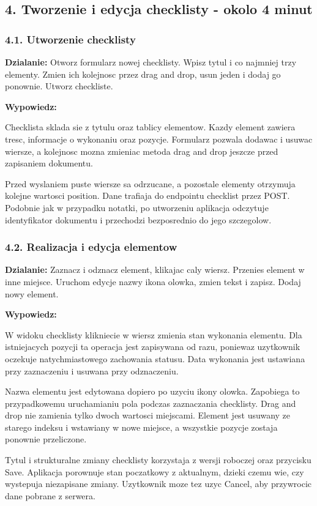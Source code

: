 \documentclass[
  polish,
  12pt,
  a4paper,
]{article}
\renewenvironment{quote}
  {\list{}{\leftmargin=1.2em\rightmargin=0.6em}%
   \item\relax\color{black}\setlength{\parskip}{0.7em}}
  {\endlist}
\begin{document}
\subsection{4. Tworzenie i edycja checklisty - okolo 4
minut}\label{4-tworzenie-i-edycja-checklisty---okolo-4-minut}

\subsubsection{4.1. Utworzenie
checklisty}\label{41-utworzenie-checklisty}

\textbf{Dzialanie:} Otworz formularz nowej checklisty. Wpisz tytul i co
najmniej trzy elementy. Zmien ich kolejnosc przez drag and drop, usun
jeden i dodaj go ponownie. Utworz checkliste.

\textbf{Wypowiedz:}

\begin{quote}
Checklista sklada sie z tytulu oraz tablicy elementow. Kazdy element
zawiera tresc, informacje o wykonaniu oraz pozycje. Formularz pozwala
dodawac i usuwac wiersze, a kolejnosc mozna zmieniac metoda drag and
drop jeszcze przed zapisaniem dokumentu.

Przed wyslaniem puste wiersze sa odrzucane, a pozostale elementy
otrzymuja kolejne wartosci position. Dane trafiaja do endpointu
checklist przez POST. Podobnie jak w przypadku notatki, po utworzeniu
aplikacja odczytuje identyfikator dokumentu i przechodzi bezposrednio do
jego szczegolow.
\end{quote}

\subsubsection{4.2. Realizacja i edycja
elementow}\label{42-realizacja-i-edycja-elementow}

\textbf{Dzialanie:} Zaznacz i odznacz element, klikajac caly wiersz.
Przenies element w inne miejsce. Uruchom edycje nazwy ikona olowka,
zmien tekst i zapisz. Dodaj nowy element.

\textbf{Wypowiedz:}

\begin{quote}
W widoku checklisty klikniecie w wiersz zmienia stan wykonania elementu.
Dla istniejacych pozycji ta operacja jest zapisywana od razu, poniewaz
uzytkownik oczekuje natychmiastowego zachowania statusu. Data wykonania
jest ustawiana przy zaznaczeniu i usuwana przy odznaczeniu.

Nazwa elementu jest edytowana dopiero po uzyciu ikony olowka. Zapobiega
to przypadkowemu uruchamianiu pola podczas zaznaczania checklisty. Drag
and drop nie zamienia tylko dwoch wartosci miejscami. Element jest
usuwany ze starego indeksu i wstawiany w nowe miejsce, a wszystkie
pozycje zostaja ponownie przeliczone.

Tytul i strukturalne zmiany checklisty korzystaja z wersji roboczej oraz
przycisku Save. Aplikacja porownuje stan poczatkowy z aktualnym, dzieki
czemu wie, czy wystepuja niezapisane zmiany. Uzytkownik moze tez uzyc
Cancel, aby przywrocic dane pobrane z serwera.
\end{quote}
\end{document}
